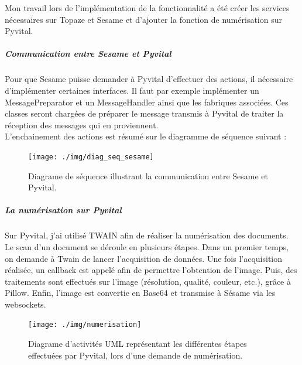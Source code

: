 Mon travail lors de l'implémentation de la fonctionnalité a été créer les services nécessaires sur Topaze et Sesame et d'ajouter la fonction de numérisation sur Pyvital.

\subparagraph*{Communication entre Sesame et Pyvital}
Pour que Sesame puisse demander à Pyvital d'effectuer des actions, il nécessaire d'implémenter certaines interfaces. Il faut par exemple implémenter un MessagePreparator et un MessageHandler ainsi que les fabriques associées. Ces classes seront chargées de préparer le message transmis à Pyvital de traiter la réception des messages qui en proviennent. \\
L'enchainement des actions est résumé sur le diagramme de séquence suivant :

\begin{figure}[H]
  \centering
  \vspace{-5pt}
  \texttt{[image: ./img/diag\_seq\_sesame]}
  \caption{\label{fig:diag_seq_sesame} Diagrame de séquence illustrant la communication entre Sesame et Pyvital.}
\end{figure}

\subparagraph*{La numérisation sur Pyvital}
Sur Pyvital, j'ai utilisé TWAIN afin de réaliser la numérisation des documents. Le scan d'un document se déroule en plusieurs étapes. Dans un premier temps, on demande à Twain de lancer l'acquisition de données. Une fois l'acquisition réalisée, un callback est appelé afin de permettre l'obtention de l'image. Puis, des traitements sont effectués sur l'image (résolution, qualité, couleur, etc.), grâce à Pillow. Enfin, l'image est convertie en Base64 et transmise à Sésame via les websockets.
 
\begin{figure}[H]
  \centering
  \vspace{-10pt}
  \texttt{[image: ./img/numerisation]}
  \caption{\label{fig:diag_seq_sesame} Diagrame d'activités UML représentant les différentes étapes effectuées par Pyvital, lors d'une demande de numérisation.}
\end{figure}


		
